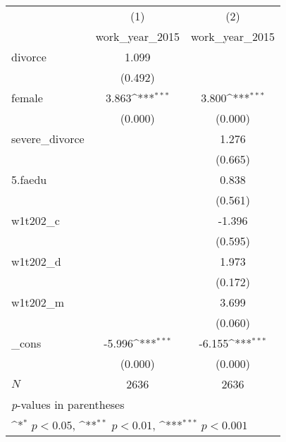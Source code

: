 {
\def\sym#1{\ifmmode^{#1}\else\(^{#1}\)\fi}
\begin{tabular}{l*{2}{c}}
\hline\hline
            &\multicolumn{1}{c}{(1)}&\multicolumn{1}{c}{(2)}\\
            &\multicolumn{1}{c}{work\_year\_2015}&\multicolumn{1}{c}{work\_year\_2015}\\
\hline
divorce     &       1.099         &                     \\
            &     (0.492)         &                     \\
[1em]
female      &       3.863\sym{***}&       3.800\sym{***}\\
            &     (0.000)         &     (0.000)         \\
[1em]
severe\_divorce&                     &       1.276         \\
            &                     &     (0.665)         \\
[1em]
5.faedu     &                     &       0.838         \\
            &                     &     (0.561)         \\
[1em]
w1t202\_c    &                     &      -1.396         \\
            &                     &     (0.595)         \\
[1em]
w1t202\_d    &                     &       1.973         \\
            &                     &     (0.172)         \\
[1em]
w1t202\_m    &                     &       3.699         \\
            &                     &     (0.060)         \\
[1em]
\_cons      &      -5.996\sym{***}&      -6.155\sym{***}\\
            &     (0.000)         &     (0.000)         \\
\hline
\(N\)       &        2636         &        2636         \\
\hline\hline
\multicolumn{3}{l}{\footnotesize \textit{p}-values in parentheses}\\
\multicolumn{3}{l}{\footnotesize \sym{*} \(p<0.05\), \sym{**} \(p<0.01\), \sym{***} \(p<0.001\)}\\
\end{tabular}
}
